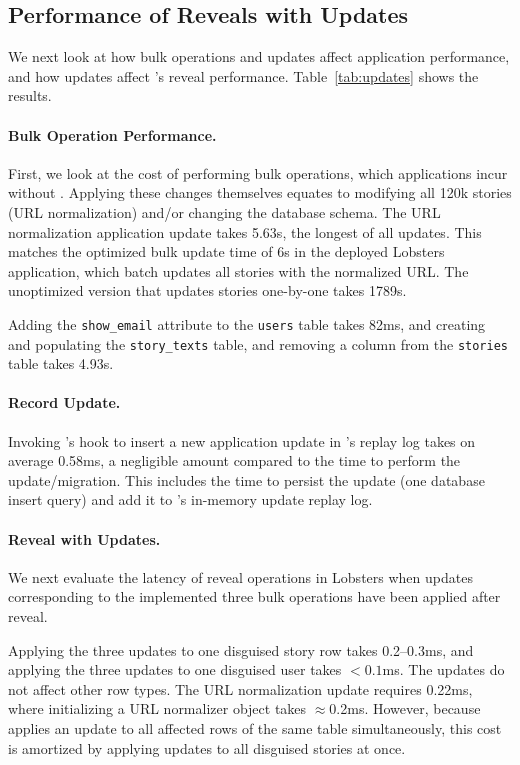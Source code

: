\subsection{Performance of Reveals with Updates}
\label{s:eval:updates}

We next look at how bulk operations and updates affect application performance,
and how updates affect \sys's reveal performance.  Table~\ref{tab:updates} shows
the results.

\paragraph{Bulk Operation Performance.}
First, we look at the cost of performing bulk operations, which applications
incur without \sys.
%
Applying these changes themselves equates to modifying all 120k stories (\eg URL 
normalization) and/or changing the database schema.  The URL normalization
application update takes 5.63s, the longest of all updates.
%
This matches the optimized bulk update time of 6s in the deployed Lobsters
application, which batch updates all stories with the normalized URL. The
unoptimized version that updates stories one-by-one takes 1789s.
%

Adding the \texttt{show\_email} attribute to the \texttt{users} table takes
82ms, and 
%
creating and populating the \texttt{story\_texts} table, and removing a column
from the \texttt{stories} table takes 4.93s.
%

%
\paragraph{Record Update.}
%
Invoking \sys's hook to insert a new application update in \sys's replay log
takes on average 0.58ms, a negligible amount compared to the time to perform the
update/migration. This includes the time to persist the update (one database
insert query) and add it to \sys's in-memory update replay log.
%

\paragraph{Reveal with Updates.}
%
We next evaluate the latency of reveal operations in Lobsters when updates
corresponding to the implemented three bulk operations have been applied after
reveal.
%

%
Applying the three updates to one disguised story row takes 0.2--0.3ms, and
applying the three updates to one disguised user takes $<0.1$ms.
%
The updates do not affect other row types.
%
The URL normalization update requires 0.22ms, where initializing a URL
normalizer object takes $\approx$0.2ms.
%
However, because \sys applies an update to all affected rows of the same table
simultaneously, this cost is amortized by applying updates to all disguised
stories at once. 
%

